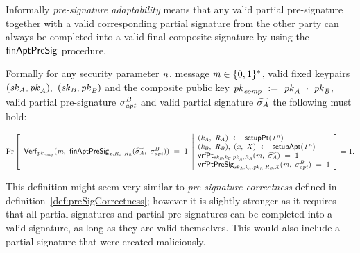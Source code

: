 \begin{definition}
    Informally \textit{pre-signature adaptability} means that any valid partial pre-signature together with a valid corresponding partial signature from the other party can
    always be completed into a valid final composite signature by using the $\mathsf{finAptPreSig}$ procedure.

    Formally for any security parameter $\mathit{n}$, message $\mathit{m} \in \{0,1\}^{*}$, valid fixed keypairs $(\mathit{sk}_{\mathit{A}}, \mathit{pk}_{\mathit{A}}) ,~ (\mathit{sk}_{\mathit{B}}, \mathit{pk}_{\mathit{B}})$ and the composite public key $\mathit{pk}_{\mathit{comp}} ~:=~ \mathit{pk}_{\mathit{A}} ~\cdot~ \mathit{pk}_{\mathit{B}}$,
    valid partial pre-signature $\sigma^{\mathit{B}}_{\mathit{apt}}$ and valid partial signature $\widetilde{\sigma_{\mathit{A}}}$ the following must hold:
    \begin{scriptsize}
        \[
            \Pr\left[
            \begin{array}{c}
                \mathsf{Verf}_{\mathit{pk}_{\mathit{comp}}}(\mathit{m} ,~ \mathsf{finAptPreSig}_{\mathit{x},\mathit{R}_{\mathit{A}},\mathit{R}_{\mathit{B}}}(\widetilde{\sigma_{\mathit{A}}} ,~ \sigma^{\mathit{B}}_{\mathit{apt}})) ~=~ 1
            \end{array}
            \middle\vert
            \begin{array}{l}
                (\mathit{\mathit{k}_{\mathit{A}}} ,~ \mathit{R}_{\mathit{A}}) ~\leftarrow~ \mathsf{setupPt} (\mathit{1^n}) \\
                (\mathit{\mathit{k}_{\mathit{B}}} ,~ \mathit{R}_{\mathit{B}}) ,~ (\mathit{x} ,~ \mathit{X}) ~\leftarrow~ \mathsf{setupApt}(\mathit{1^n}) \\
                \mathsf{vrfPt}_{\mathit{sk}_{\mathit{B}},\mathit{\mathit{k}_{\mathit{B}}},\mathit{pk}_{\mathit{A}},\mathit{R}_{\mathit{A}}}(\mathit{m} ,~ \widetilde{\sigma_{\mathit{A}}}) ~=~ 1 \\
                \mathsf{vrfPtPreSig}_{\mathit{sk}_{\mathit{A}},\mathit{\mathit{k}_{\mathit{A}}},\mathit{pk}_{\mathit{B}},\mathit{R}_{\mathit{B}},\mathit{X}}(\mathit{m} ,~ \sigma^{\mathit{B}}_{\mathit{apt}}) ~=~ 1
            \end{array}
            \right]=1.
        \]
    \end{scriptsize}
    This definition might seem very similar to \textit{pre-signature correctness} defined in definition~\ref{def:preSigCorrectness}; however it is slightly stronger as it requires that all partial signatures and partial pre-signatures can be completed
    into a valid signature, as long as they are valid themselves. This would also include a partial signature that were created maliciously.
\end{definition}

